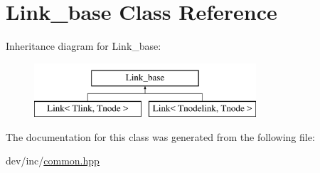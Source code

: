 \hypertarget{classLink__base}{\section{Link\-\_\-base Class Reference}
\label{classLink__base}
}
Inheritance diagram for Link\-\_\-base\-:\begin{figure}[H]
\begin{center}
\leavevmode
\includegraphics[height=2.000000cm]{classLink__base}
\end{center}
\end{figure}


The documentation for this class was generated from the following file\-:\begin{DoxyCompactItemize}
\item 
dev/inc/\hyperlink{common_8hpp}{common.\-hpp}\end{DoxyCompactItemize}
